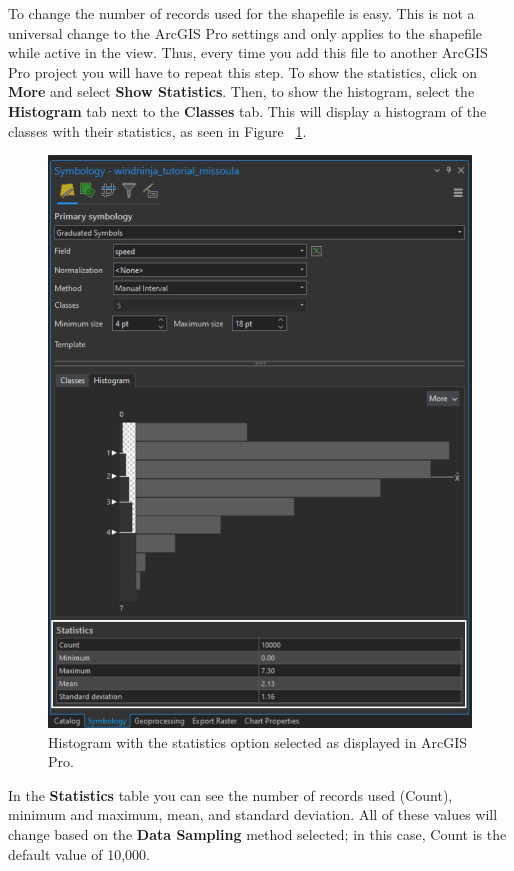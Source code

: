 \documentclass[12pt]{article}
\begin{document}
\pagebreak

To change the number of records used for the shapefile is easy. This is not a universal change to the ArcGIS Pro settings and only applies to the shapefile while active in the view. Thus, every time you add this file to another ArcGIS Pro project you will have to repeat this step. To show the statistics, click on \textbf{More} and select \textbf{Show Statistics}. Then, to show the histogram, select the \textbf{Histogram} tab next to the \textbf{Classes} tab. This will display a histogram of the classes with their statistics, as seen in Figure ~\ref{fig:Figure18}.

\begin{figure}[H]
	\centering
	\includegraphics[scale=0.42]{arc_18.png}
	\caption{Histogram with the statistics option selected as displayed in ArcGIS Pro.}
\label{fig:Figure18}
\end{figure}

In the \textbf{Statistics} table you can see the number of records used (Count), minimum and maximum, mean, and standard deviation. All of these values will change based on the \textbf{Data Sampling} method selected; in this case, Count is the default value of 10,000.  
\end{document}
